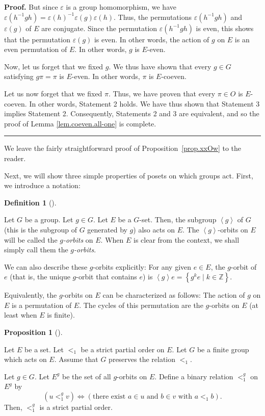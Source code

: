 \documentclass[numbers=enddot,12pt,final,onecolumn,notitlepage,abstracton]{scrartcl}%
\theoremstyle{definition}
\newtheorem{prop}[theo]{Proposition}
\newenvironment{proposition}[1][]
{\begin{prop}[#1]\begin{leftbar}}
{\end{leftbar}\end{prop}}
\newtheorem{defi}[theo]{Definition}
\newenvironment{definition}[1][]
{\begin{defi}[#1]\begin{leftbar}}
{\end{leftbar}\end{defi}}
\newenvironment{proof}[1][Proof]{\noindent\textbf{#1.} }{\ \rule{0.5em}{0.5em}}
\newcommand{\ZZ}{{\mathbb{Z}}}
\begin{document}
\begin{proof}
But since $\varepsilon$ is a group homomorphism, we have $\varepsilon\left(
h^{-1}gh\right)  =\varepsilon\left(  h\right)  ^{-1}\varepsilon\left(
g\right)  \varepsilon\left(  h\right)  $. Thus, the permutations
$\varepsilon\left(  h^{-1}gh\right)  $ and $\varepsilon\left(  g\right)  $ of
$E$ are conjugate. Since the permutation $\varepsilon\left(  h^{-1}gh\right)
$ is even, this shows that the permutation $\varepsilon\left(  g\right)  $ is
even. In other words, the action of $g$ on $E$ is an even permutation of $E$.
In other words, $g$ is $E$-even.

Now, let us forget that we fixed $g$. We thus have shown that every $g\in G$
satisfying $g\pi=\pi$ is $E$-even. In other words, $\pi$ is $E$-coeven.

Let us now forget that we fixed $\pi$. Thus, we have proven that every $\pi\in
O$ is $E$-coeven. In other words, Statement 2 holds. We have thus shown that
Statement 3 implies Statement 2. Consequently, Statements 2 and 3 are
equivalent, and so the proof of Lemma \ref{lem.coeven.all-one} is complete.
\end{proof}


We leave the fairly straightforward proof of Proposition~\ref{prop.xxOw}
to the reader.


Next, we will show three simple properties of posets on which
groups act. First, we introduce a notation:

\begin{definition}
\label{def.G-poset.g-orbit}
Let $G$ be a group. Let $g \in G$. Let $E$ be a $G$-set.
Then, the subgroup $\left< g \right>$ of $G$ (this is the
subgroup of $G$ generated by $g$) also acts on $E$. The
$\left< g \right>$-orbits on $E$ will be called the
\textit{$g$-orbits} on $E$. When $E$ is clear from the
context, we shall simply call them the
\textit{$g$-orbits}.

We can also describe these $g$-orbits explicitly: For any given
$e \in E$, the $g$-orbit of $e$ (that is, the unique
$g$-orbit that contains $e$) is
$\left< g \right> e = \left\{ g^k e \mid k \in \ZZ \right\}$.

Equivalently, the $g$-orbits on $E$ can be characterized as
follows: The action of $g$ on $E$ is a permutation of $E$.
The cycles of this permutation are the $g$-orbits on $E$
(at least when $E$ is finite).
\end{definition}

\begin{proposition}
\label{prop.G-poset.quot.poset}
Let $E$ be a set. Let $<_1$ be a strict partial order on $E$.
Let $G$ be a finite group which acts on $E$. Assume that $G$ preserves
the relation $<_1$.

Let $g \in G$. Let $E^g$ be the set of all $g$-orbits
on $E$. Define a binary relation $<_1^g$ on $E^g$ by
\[
\left(  u<_{1}^{g}v\right)  \Longleftrightarrow\left(  \text{there exist }a\in
u\text{ and }b\in v\text{ with }a<_{1}b\right)  .
\]
Then, $<_1^g$ is a strict partial order.
\end{proposition}
\end{document}
